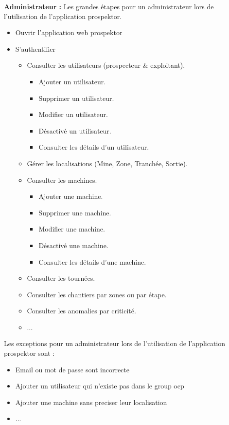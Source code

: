 \textbf{Administrateur :} Les grandes \'etapes pour un administrateur lors de l'utilisation de l'application prospektor.
\begin{itemize}
  \item Ouvrir l'application web prospektor
  \item S'authentifier
  \begin{itemize}
    \item Consulter les utilisateurs (prospecteur \& exploitant).
    \begin{itemize}
    \item Ajouter un utilisateur.
    \item Supprimer un utilisateur.
    \item Modifier un utilisateur.
    \item D\'esactiv\'e un utilisateur.
    \item Consulter les d\'etails d'un utilisateur.
    \end{itemize}
    \item G\'erer les localisations (Mine, Zone, Tranch\'ee, Sortie).
    \item Consulter les machines.
    \begin{itemize}
    \item Ajouter une machine.
    \item Supprimer une machine.
    \item Modifier une machine.
    \item D\'esactiv\'e une machine.
    \item Consulter les d\'etails d'une machine.
    \end{itemize}
    \item Consulter les tourn\'ees.
    \item Consulter les chantiers par zones ou par \'etape.
    \item Consulter les anomalies par criticit\'e.
    \item ...

  \end{itemize}
\end{itemize}

Les exceptions pour un administrateur lors de l'utilisation de l'application prospektor sont :
\begin{itemize}
\item Email ou mot de passe sont incorrecte
\item Ajouter un utilisateur qui n'existe pas dans le group ocp
\item Ajouter une machine sans preciser leur localisation
\item ...
\end{itemize}

